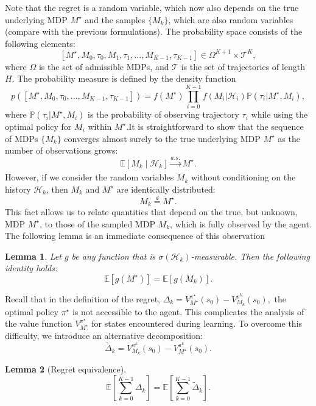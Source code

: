 \documentclass{article}
\numberwithin{equation}{section}
\newtheorem{lemma}{Lemma}
\newcommand{\cH}{\mathcal{H}}
\newcommand{\cT}{\mathcal{T}}
\begin{document}
Note that the regret is a random variable, which now also depends on the true underlying MDP \( M^{\star} \) and the samples \( \{M_k\} \), which are also random variables (compare with the previous formulations). The probability space consists of the following elements:
\[[M^{\star}, M_0, \tau_0, M_1,\tau_1,...,M_{K-1}, \tau_{K-1}]\in \Omega^{K+1}\times\cT^K,\]
where \( \Omega \) is the set of admissible MDPs, and \( \mathcal{T} \) is the set of trajectories of length \( H \). The probability measure is defined by the density function
\[p([M^{\star}, M_0, \tau_0,...,M_{K-1}, \tau_{K-1}]) = f(M^{\star})\prod_{i=0}^{K-1}f(M_i|\cH_i)\mathbb P(\tau_i|M^{\star}, M_i),\]
where \( \mathbb{P}(\tau_i | M^{\star}, M_i) \) is the probability of observing trajectory \( \tau_i \) while using the optimal policy for \( M_i \) within \( M^{\star} \).It is straightforward to show that the sequence of MDPs \(\{M_k\}\) converges almost surely to the true underlying MDP \(M^{\star}\) as the number of observations grows:
\[
\mathbb{E}[M_k \mid \mathcal{H}_k] \xrightarrow[]{a.s.} M^{\star}.
\]
However, if we consider the random variables \(M_k\) without conditioning on the history \(\mathcal{H}_k\), then \(M_k\) and \(M^{\star}\) are identically distributed:
\[
M_k \overset{d}{=} M^{\star}.
\]
This fact allows us to relate quantities that
depend on the true, but unknown, MDP \(M^{\star}\), to those of the sampled MDP \(M_k\), which is fully observed by the agent. The following lemma is an immediate consequence of this observation 

\begin{lemma}\label{lem:psrl_equiv}
    Let \(g\) be any function that is \(\sigma(\mathcal{H}_k)\)-measurable. Then the following identity holds:
    \[
    {\mathbb{E}[g(M^{\star}) ] = \mathbb{E}[g(M_k)].}
    \]
\end{lemma}

Recall that in the definition of the regret, \(\Delta_k = V^{\pi^{\star}}_{M^{\star}}(s_0) - V^{\pi^k}_{M_k}(s_0),\) the optimal policy \(\pi^{\star}\) is not accessible to the agent. This complicates the analysis of the value function \(V^{\pi^{\star}}_{M^{\star}}\) for states encountered during learning. To overcome this difficulty, we introduce an alternative decomposition:
\[
\widetilde{\Delta}_k = V^{\pi^k}_{M_k}(s_0) - V^{\pi^k}_{M^{\star}}(s_0).
\]

\begin{lemma}[Regret equivalence]\label{regret_equiv}
    \[
    \mathbb{E} \left[ \sum_{k=0}^{K-1} \Delta_k \right] = \mathbb{E} \left[ \sum_{k=0}^{K-1} \widetilde{\Delta}_k \right].
    \]
\end{lemma}
\end{document}
